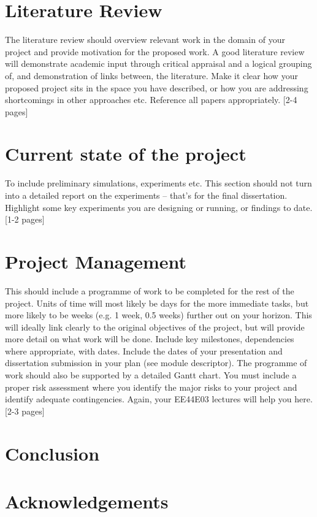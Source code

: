 \documentclass[12pt]{extarticle}
\begin{document}
\newpage
\section{Literature Review}

The literature review should overview relevant work in the domain of your project and provide motivation for the proposed work. A good literature review will demonstrate academic input through critical appraisal and a logical grouping of, and demonstration of links between, the literature. Make it clear how your proposed project sits in the space you have described, or how you are addressing shortcomings in other approaches etc. Reference all papers appropriately. [2-4 pages] 

\newpage
\section{Current state of the project}

To include preliminary simulations, experiments etc. This section should not turn into a detailed report on the experiments – that’s for the final dissertation. Highlight some key experiments you are designing or running, or findings to date. [1-2 pages]   

\newpage
\section{Project Management}

This should include a programme of work to be completed for the rest of the project. Units of time will most likely be days for the more immediate tasks, but more likely to be weeks (e.g. 1 week, 0.5 weeks) further out on your horizon. This will ideally link clearly to the original objectives of the project, but will provide more detail on what work will be done. Include key milestones, dependencies where appropriate, with dates. Include the dates of your presentation and dissertation submission in your plan (see module descriptor). The programme of work should also be supported by a detailed Gantt chart. You must include a proper risk assessment where you identify the major risks to your project and identify adequate contingencies. Again, your EE44E03 lectures will help you here. [2-3 pages] 

\newpage
\section{Conclusion}

\newpage
\section{Acknowledgements}
\end{document}
